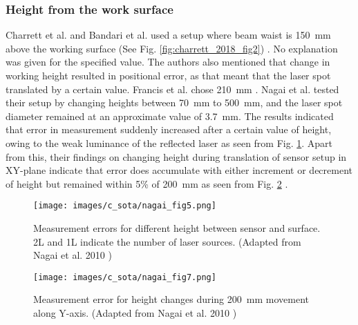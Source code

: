     
    \subsubsection{Height from the work surface}
    Charrett et al. and Bandari et al. used a setup where beam waist is \SI{150}{\milli\meter} above the working surface (See Fig. \ref{fig:charrett_2018_fig2}) \cite{charrett_2018, bandari}. No explanation was given for the specified value. The authors also mentioned that change in working height resulted in positional error, as that meant that the laser spot translated by a certain value. Francis et al. chose \SI{210}{\milli\meter} \cite{francis_autonomous}. Nagai et al. tested their setup by changing heights between \SI{70}{\milli\meter} to \SI{500}{\milli\meter}, and the laser spot diameter remained at an approximate value of \SI{3.7}{\milli\meter}. The results indicated that error in measurement suddenly increased after a certain value of height, owing to the weak luminance of the reflected laser as seen from Fig. \ref{fig:nagai_fig5}. Apart from this, their findings on changing height during translation of sensor setup in XY-plane indicate that error does accumulate with either increment or decrement of height but remained within 5\% of \SI{200}{\milli\meter} as seen from Fig. \ref{fig:nagai_fig7} \cite{nagai}.

    \begin{figure}[h]
        \centering
        \texttt{[image: images/c\_sota/nagai\_fig5.png]}
        \caption{Measurement errors for different height between sensor and surface. 2L and 1L indicate the number of laser sources. (Adapted from Nagai et al. 2010 \cite{nagai})}
        \label{fig:nagai_fig5}
    \end{figure}

    \begin{figure}[h]
        \centering
        \texttt{[image: images/c\_sota/nagai\_fig7.png]}
        \caption{Measurement error for height changes during \SI{200}{\milli\meter} movement along Y-axis. (Adapted from Nagai et al. 2010 \cite{nagai})}
        \label{fig:nagai_fig7}
    \end{figure}

